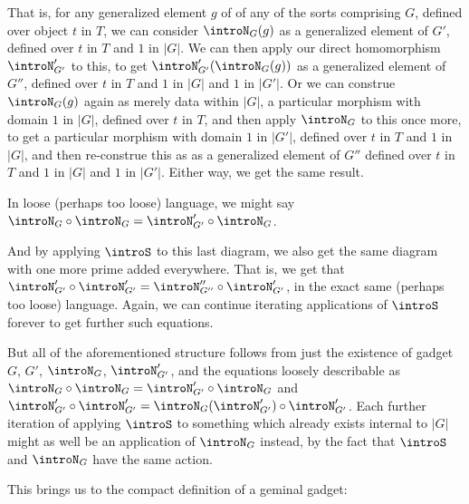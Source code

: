 \begin{observation}
That is, for any generalized element $g$ of of any of the sorts comprising $G$, defined over object $t$ in $T$, we can consider $\introN_G(g)$ as a generalized element of $G'$, defined over $t$ in $T$ and $1$ in $|G|$. We can then apply our direct homomorphism $\introN'_{G'}$ to this, to get $\introN'_{G'}(\introN_G(g))$ as a generalized element of $G''$, defined over $t$ in $T$ and $1$ in $|G|$ and $1$ in $|G'|$. Or we can construe $\introN_G(g)$ again as merely data within $|G|$, a particular morphism with domain $1$ in $|G|$, defined over $t$ in $T$, and then apply $\introN_G$ to this once more, to get a particular morphism with domain $1$ in $|G'|$, defined over $t$ in $T$ and $1$ in $|G|$, and then re-construe this as as a generalized element of $G''$ defined over $t$ in $T$ and $1$ in $|G|$ and $1$ in $|G'|$. Either way, we get the same result.

In loose (perhaps too loose) language, we might say $\introN_G \circ \introN_G = \introN'_{G'} \circ \introN_G$.

And by applying $\introS$ to this last diagram, we also get the same diagram with one more prime added everywhere. That is, we get that $\introN'_{G'} \circ \introN'_{G'} = \introN''_{G''} \circ \introN'_{G'}$, in the exact same (perhaps too loose) language. Again, we can continue iterating applications of $\introS$ forever to get further such equations.

But all of the aforementioned structure follows from just the existence of gadget $G$, $G'$, $\introN_G$, $\introN'_{G'}$, and the equations loosely describable as $\introN_G \circ \introN_G = \introN'_{G'} \circ \introN_G$ and $\introN'_{G'} \circ \introN'_{G'} = \introN_G(\introN'_{G'}) \circ \introN'_{G'}$. Each further iteration of applying $\introS$ to something which already exists internal to $|G|$ might as well be an application of $\introN_{G}$ instead, by the fact that $\introS$ and $\introN_{G}$ have the same action.
\end{observation}

This brings us to the compact definition of a geminal gadget:

